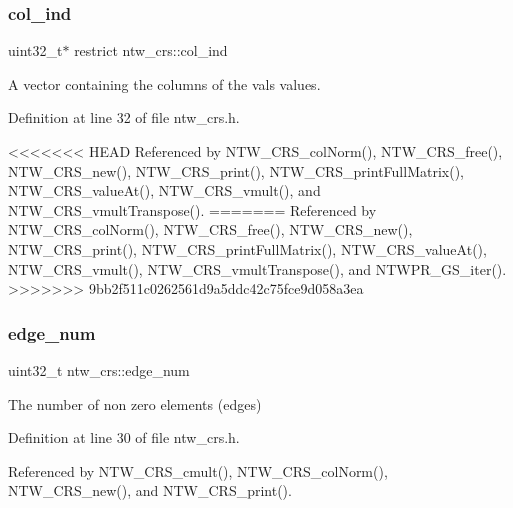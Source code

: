 \subsubsection{\texorpdfstring{col\+\_\+ind}{col\_ind}}
{\footnotesize\ttfamily uint32\+\_\+t$\ast$ restrict ntw\+\_\+crs\+::col\+\_\+ind}

A vector containing the columns of the val\textquotesingle{}s values. 

Definition at line 32 of file ntw\+\_\+crs.\+h.



<<<<<<< HEAD
Referenced by N\+T\+W\+\_\+\+C\+R\+S\+\_\+col\+Norm(), N\+T\+W\+\_\+\+C\+R\+S\+\_\+free(), N\+T\+W\+\_\+\+C\+R\+S\+\_\+new(), N\+T\+W\+\_\+\+C\+R\+S\+\_\+print(), N\+T\+W\+\_\+\+C\+R\+S\+\_\+print\+Full\+Matrix(), N\+T\+W\+\_\+\+C\+R\+S\+\_\+value\+At(), N\+T\+W\+\_\+\+C\+R\+S\+\_\+vmult(), and N\+T\+W\+\_\+\+C\+R\+S\+\_\+vmult\+Transpose().
=======
Referenced by N\+T\+W\+\_\+\+C\+R\+S\+\_\+col\+Norm(), N\+T\+W\+\_\+\+C\+R\+S\+\_\+free(), N\+T\+W\+\_\+\+C\+R\+S\+\_\+new(), N\+T\+W\+\_\+\+C\+R\+S\+\_\+print(), N\+T\+W\+\_\+\+C\+R\+S\+\_\+print\+Full\+Matrix(), N\+T\+W\+\_\+\+C\+R\+S\+\_\+value\+At(), N\+T\+W\+\_\+\+C\+R\+S\+\_\+vmult(), N\+T\+W\+\_\+\+C\+R\+S\+\_\+vmult\+Transpose(), and N\+T\+W\+P\+R\+\_\+\+G\+S\+\_\+iter().
>>>>>>> 9bb2f511c0262561d9a5ddc42c75fce9d058a3ea

\mbox{\label{structntw__crs_a85160ebade6d93ba77c9e90f2f237cea}} 
\subsubsection{\texorpdfstring{edge\+\_\+num}{edge\_num}}
{\footnotesize\ttfamily uint32\+\_\+t ntw\+\_\+crs\+::edge\+\_\+num}

The number of non zero elements (edges) 

Definition at line 30 of file ntw\+\_\+crs.\+h.



Referenced by N\+T\+W\+\_\+\+C\+R\+S\+\_\+cmult(), N\+T\+W\+\_\+\+C\+R\+S\+\_\+col\+Norm(), N\+T\+W\+\_\+\+C\+R\+S\+\_\+new(), and N\+T\+W\+\_\+\+C\+R\+S\+\_\+print().

\mbox{\label{structntw__crs_a36a11fbae59bf6159e40cb18e5f37ada}} 
